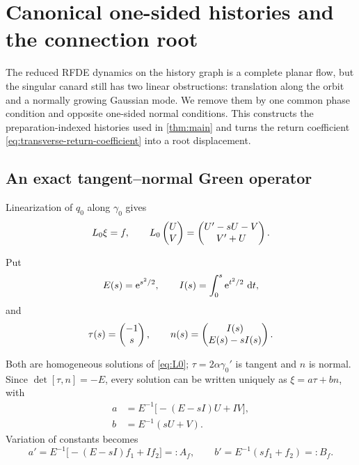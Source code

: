 \section{Canonical one-sided histories and the connection root}
\label{sec:connection}

The reduced RFDE dynamics on the history graph is a complete planar flow,
but the singular canard still has two linear obstructions: translation
along the orbit and a normally growing Gaussian mode.  We remove them by
one common phase condition and opposite one-sided normal conditions.  This
constructs the preparation-indexed histories used in
\cref{thm:main} and turns the return coefficient
\cref{eq:transverse-return-coefficient} into a root displacement.

\subsection{An exact tangent--normal Green operator}

Linearization of \(q_0\) along \(\gamma_0\) gives
\begin{equation}
\label{eq:L0}
 L_0\xi=f,\qquad
 L_0\begin{pmatrix}U\\V\end{pmatrix}=\begin{pmatrix}U'-sU-V\\V'+U\end{pmatrix}.
\end{equation}
\begin{samepage}
Put
\begin{equation}
\label{eq:fundamental-modes}
 E(s)=\mathrm e^{s^2/2},\qquad I(s)=\int_0^s\mathrm e^{t^2/2}\,\,\mathrm d t,
\end{equation}
and
\begin{equation}
\label{eq:tau-n}
 \tau(s)=\begin{pmatrix}-1\\s\end{pmatrix},
 \qquad n(s)=\begin{pmatrix}I(s)\\E(s)-sI(s)\end{pmatrix}.
\end{equation}
\end{samepage}
Both are homogeneous solutions of \cref{eq:L0}; \(\tau=2\alpha\gamma_0'\)
is tangent and \(n\) is normal.  Since
\(\det[\tau,n]=-E\), every solution can be written uniquely as
\(\xi=a\tau+bn\), with
\begin{equation}
\label{eq:ab-coordinates}
\begin{aligned}
 a&=E^{-1}\bigl[-(E-sI)U+IV\bigr],\\
 b&=E^{-1}(sU+V).
\end{aligned}
\end{equation}
Variation of constants becomes
\begin{equation}
\label{eq:ab-variation}
 a'=E^{-1}\bigl[-(E-sI)f_1+If_2\bigr]=:A_f,
 \qquad
 b'=E^{-1}(sf_1+f_2)=:B_f.
\end{equation}

